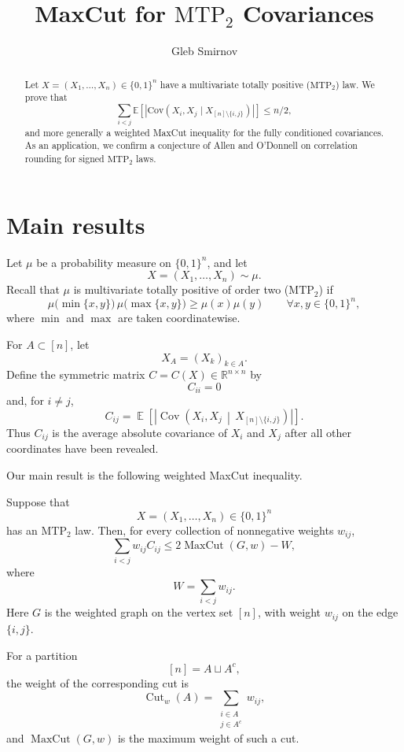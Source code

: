 \documentclass[12pt,reqno]{amsart}
\numberwithin{equation}{section}
\DeclareMathOperator{\E}{\mathbb{E}}
\DeclareMathOperator{\Cov}{Cov} \newcommand{\MTP}{\mathrm{MTP}_2}
\begin{document}
\title[MaxCut for \(\mathrm{MTP}_2\) Covariances
]{MaxCut for \(\mathrm{MTP}_2\) Covariances}

\author{Gleb Smirnov}
\address{
Mathematical Sciences Institute, 
Australian National University, Canberra, Australia}



\begin{abstract}
Let $X=(X_1,\dots,X_n)\in\{0,1\}^n$ have a multivariate totally positive ($\mathrm{MTP}_2$) law. We prove that $$ \sum_{i<j}\mathbb{E}\left[\left|\mathrm{Cov}(X_i,X_j \mid X_{[n]\setminus\{i,j\}})\right|\right] \le n/2, $$ and more generally a weighted MaxCut inequality for the fully conditioned covariances. As an application, we confirm a conjecture of Allen and O'Donnell on correlation rounding for signed $\mathrm{MTP}_2$ laws.
\end{abstract}





\maketitle
\setcounter{section}{0}

\section{Main results}\label{intro}

Let \(\mu\) be a probability measure on \(\{0,1\}^n\), and let
\[
X=(X_1,\dots,X_n)\sim\mu.
\]
Recall that \(\mu\) is multivariate totally positive of order two (\(\MTP\)) if
\[
\mu\bigl(\min\{x,y\}\bigr)\,
\mu\bigl(\max\{x,y\}\bigr)
\ge
\mu(x)\mu(y)
\qquad
\forall x,y\in\{0,1\}^n,
\]
where \(\min\) and \(\max\) are taken coordinatewise.
\smallskip%

For \(A\subset[n]\), let
\[
X_A=(X_k)_{k\in A}.
\]
Define the symmetric matrix \(C=C(X)\in\mathbb R^{n\times n}\) by
\[
C_{ii}=0
\]
and, for \(i\ne j\),
\[
C_{ij}
=
\E\!\left[
\left|
\Cov\!\left(
X_i,X_j
\,\middle|\,
X_{[n]\setminus\{i,j\}}
\right)
\right|
\right].
\]
Thus \(C_{ij}\) is the average absolute covariance of \(X_i\) and \(X_j\)
after all other coordinates have been revealed.
\smallskip%

Our main result is the following weighted MaxCut inequality.

\begin{theorem}\label{thm:main}
Suppose that
\[
X=(X_1,\dots,X_n)\in\{0,1\}^n
\]
has an \(\MTP\) law. Then, for every collection of nonnegative weights
\(w_{ij}\),
\[
\sum_{i<j} w_{ij} C_{ij}
\le
2\operatorname{MaxCut}(G,w)-W,
\]
where
\[
W=\sum_{i<j}w_{ij}.
\]
Here \(G\) is the weighted graph on the vertex set \([n]\), with weight \(w_{ij}\) on the edge \(\{i,j\}\).
\end{theorem}
For a partition
\[
[n]=A\sqcup A^c,
\]
the weight of the corresponding cut is
\[
\operatorname{Cut}_w(A)
=
\sum_{\substack{i\in A\\ j\in A^c}} w_{ij},
\]
and \(\operatorname{MaxCut}(G,w)\) is the maximum weight of such a cut.
\smallskip%
\end{document}
